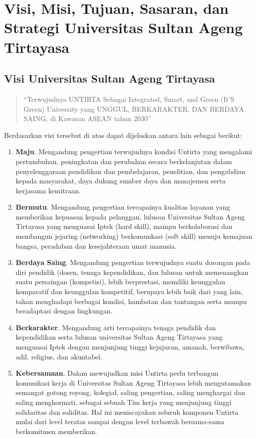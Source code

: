 \documentclass[
]{book}
\begin{document}
\hypertarget{visi-misi-tujuan-sasaran-dan-strategi-universitas-sultan-ageng-tirtayasa}{%
\section{Visi, Misi, Tujuan, Sasaran, dan Strategi Universitas Sultan Ageng Tirtayasa}\label{visi-misi-tujuan-sasaran-dan-strategi-universitas-sultan-ageng-tirtayasa}}

\hypertarget{visi-universitas-sultan-ageng-tirtayasa}{%
\subsection{Visi Universitas Sultan Ageng Tirtayasa}\label{visi-universitas-sultan-ageng-tirtayasa}}

\begin{quote}
``Terwujudnya UNTIRTA Sebagai Integrated, Smart, and Green (It'S Green) University yang UNGGUL, BERKARAKTER, DAN BERDAYA SAING, di Kawasan ASEAN tahun 2030''
\end{quote}

Berdasarkan visi tersebut di atas dapat dijelaskan antara lain sebagai berikut:

\begin{enumerate}
\def\labelenumi{\arabic{enumi}.}
\item
  \textbf{Maju}. Mengandung pengertian terwujudnya kondisi Untirta yang mengalami pertumbuhan, peningkatan dan perubahan secara berkelanjutan dalam penyelenggaraan pendidikan dan pembelajaran, penelitian, dan pengabdian kepada masyarakat, daya dukung sumber daya dan manajemen serta kerjasama kemitraan.
\item
  \textbf{Bermutu}. Mengandung pengertian tercapainya kualitas layanan yang memberikan kepuasan kepada pelanggan, lulusan Universitas Sultan Ageng Tirtayasa yang menguasai Iptek (hard skill), mampu berkolaborasi dan membangun jejaring (networking) berkomunkasi (soft skill) menuju kemajuan bangsa, peradaban dan kesejahteraan umat manusia.
\item
  \textbf{Berdaya Saing}. Mengandung pengertian terwujudnya suatu dorongan pada diri pendidik (dosen, tenaga kependidikan, dan lulusan untuk memenangkan suatu persaingan (kompetisi), lebih berprestasi, memiliki keunggulan komparatif dan keunggulan kompetitif, berupaya lebih baik dari yang lain, tahan menghadapi berbagai kondisi, hambatan dan tantangan serta mampu beradaptasi dengan lingkungan.
\item
  \textbf{Berkarakter}. Mengandung arti tercapainya tenaga pendidik dan kependidikan serta lulusan universitas Sultan Ageng Tirtayasa yang menguasai Iptek dengan menjunjung tinggi kejujuran, amanah, berwibawa, adil, religius, dan akuntabel.
\item
  \textbf{Kebersamaan}. Dalam mewujudkan misi Untirta perlu terbangun komunikasi kerja di Universitas Sultan Ageng Tirtayasa lebih mengutamakan semangat gotong royong, kolegial, saling pengertian, saling menghargai dan saling menghormati, sebagai sebuah Tim kerja yang menjunjung tinggi solidaritas dan soliditas. Hal ini meniscayakan seluruh komponen Untirta mulai dari level teratas sampai dengan level terbawah bersama-sama berkomitmen memberikan.
\end{enumerate}
\end{document}
